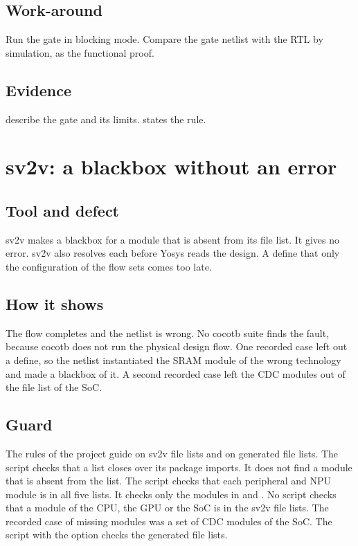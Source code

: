 \subsection*{Work-around}
Run the gate in blocking mode. Compare the gate netlist with the RTL by simulation, as the functional proof.

\subsection*{Evidence}
 describe the gate and its limits.  states the rule.

\section{sv2v: a blackbox without an error}\label{tm:defect:sv2v-blackbox}
\subsection*{Tool and defect}
sv2v makes a blackbox for a module that is absent from its file list. It gives no error. sv2v also resolves each  before Yosys reads the design. A define that only the configuration of the flow sets comes too late.

\subsection*{How it shows}
The flow completes and the netlist is wrong. No cocotb suite finds the fault, because cocotb does not run the physical design flow. One recorded case left out a define, so the netlist instantiated the SRAM module of the wrong technology and made a blackbox of it. A second recorded case left the CDC modules out of the file list of the SoC.

\subsection*{Guard}
The rules of the project guide on sv2v file lists and on generated file lists. The script  checks that a list closes over its package imports. It does not find a module that is absent from the list. The script  checks that each peripheral and NPU module is in all five lists. It checks only the modules in  and . No script checks that a module of the CPU, the GPU or the SoC is in the sv2v file lists. The recorded case of missing modules was a set of CDC modules of the SoC. The script  with the option  checks the generated file lists.

